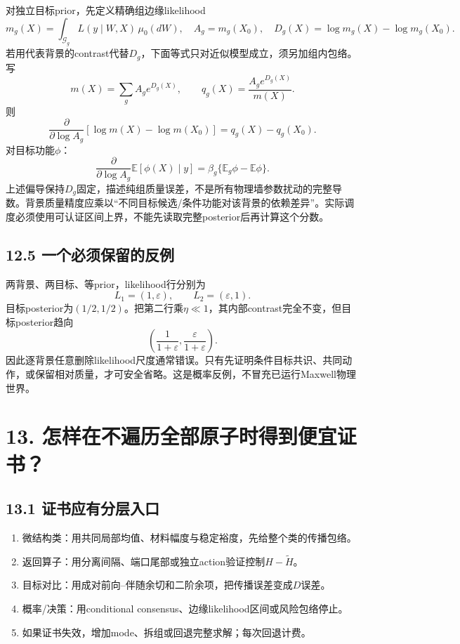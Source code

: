 \documentclass[
  10pt,
  a4paper,
]{article}
\providecommand{\tightlist}{%
  \setlength{\itemsep}{0pt}\setlength{\parskip}{0pt}}
\providecommand{\tightlist}{\setlength{\itemsep}{1pt}\setlength{\parskip}{1pt}}
\begin{document}
对独立目标prior，先定义精确组边缘likelihood \[
m_g(X)=\int_{\mathcal G_g}L(y\mid W,X)\,\mu_0(dW),\quad
A_g=m_g(X_0),\quad D_g(X)=\log m_g(X)-\log m_g(X_0).
\]
若用代表背景的contrast代替\(D_g\)，下面等式只对近似模型成立，须另加组内包络。写
\[
m(X)=\sum_g A_g e^{D_g(X)},\qquad
q_g(X)=\frac{A_g e^{D_g(X)}}{m(X)}.
\] 则 \[
\boxed{
\frac{\partial}{\partial\log A_g}
[\log m(X)-\log m(X_0)]
=q_g(X)-q_g(X_0).
}
\] 对目标功能\(\phi\)： \[
\frac{\partial}{\partial\log A_g}\mathbb E[\phi(X)\mid y]
=\beta_g\{\mathbb E_g\phi-\mathbb E\phi\}.
\]
上述偏导保持\(D_g\)固定，描述纯组质量误差，不是所有物理墙参数扰动的完整导数。背景质量精度应乘以``不同目标候选/条件功能对该背景的依赖差异''。实际调度必须使用可认证区间上界，不能先读取完整posterior后再计算这个分数。

\hypertarget{ux4e00ux4e2aux5fc5ux987bux4fddux7559ux7684ux53cdux4f8b}{%
\subsection{12.5
一个必须保留的反例}\label{ux4e00ux4e2aux5fc5ux987bux4fddux7559ux7684ux53cdux4f8b}}

两背景、两目标、等prior，likelihood行分别为 \[
L_1=(1,\varepsilon),\qquad L_2=(\varepsilon,1).
\]
目标posterior为\((1/2,1/2)\)。把第二行乘\(\eta\ll1\)，其内部contrast完全不变，但目标posterior趋向
\[
\left(\frac1{1+\varepsilon},\frac{\varepsilon}{1+\varepsilon}\right).
\]
因此逐背景任意删除likelihood尺度通常错误。只有先证明条件目标共识、共同动作，或保留相对质量，才可安全省略。这是概率反例，不冒充已运行Maxwell物理世界。

\hypertarget{ux600eux6837ux5728ux4e0dux904dux5386ux5168ux90e8ux539fux5b50ux65f6ux5f97ux5230ux4fbfux5b9cux8bc1ux4e66}{%
\section{13.
怎样在不遍历全部原子时得到便宜证书？}\label{ux600eux6837ux5728ux4e0dux904dux5386ux5168ux90e8ux539fux5b50ux65f6ux5f97ux5230ux4fbfux5b9cux8bc1ux4e66}}

\hypertarget{ux8bc1ux4e66ux5e94ux6709ux5206ux5c42ux5165ux53e3}{%
\subsection{13.1
证书应有分层入口}\label{ux8bc1ux4e66ux5e94ux6709ux5206ux5c42ux5165ux53e3}}

\begin{enumerate}
\def\labelenumi{\arabic{enumi}.}
\tightlist
\item
  微结构类：用共同局部均值、材料幅度与稳定裕度，先给整个类的传播包络。
\item
  返回算子：用分离间隔、端口尾部或独立action验证控制\(H-\widetilde H\)。
\item
  目标对比：用成对前向--伴随余切和二阶余项，把传播误差变成\(D\)误差。
\item
  概率/决策：用conditional consensus、边缘likelihood区间或风险包络停止。
\item
  如果证书失效，增加mode、拆组或回退完整求解；每次回退计费。
\end{enumerate}
\end{document}
